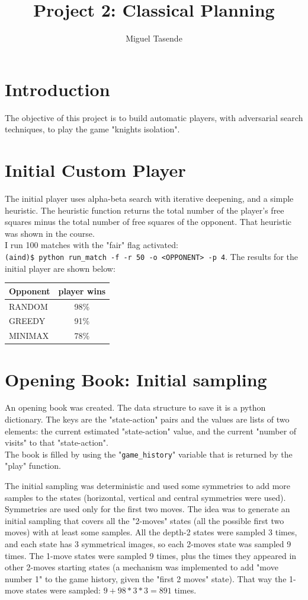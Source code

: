 \documentclass[a4paper,12pt]{article}
\title{\textbf{Project 2: Classical Planning}}
\author{Miguel Tasende}
\begin{document}
\maketitle

\section{Introduction}
The objective of this project is to build automatic players, with adversarial search techniques, to play the game "knights isolation".

\section{Initial Custom Player}
The initial player uses alpha-beta search with iterative deepening, and a simple heuristic. The heuristic function returns the total number of the player's free squares minus the total number of free squares of the opponent. That heuristic was shown in the course.\\
I run 100 matches with the "fair" flag activated: \\
\verb+(aind)$ python run_match -f -r 50 -o <OPPONENT> -p 4+.
The results for the initial player are shown below:\\

\begin{tabular}{|l|c|}
 \hline
Opponent & player wins\\
\hline
RANDOM & 98\% \\
\hline
GREEDY & 91\% \\
\hline
MINIMAX & 78\% \\
\hline
\end{tabular}


\section{Opening Book: Initial sampling}
An opening book was created. The data structure to save it is a python dictionary. The keys are the "state-action" pairs and the values are lists of two elements: the current estimated "state-action" value, and the current "number of visits" to that "state-action".\\
The book is filled by using the "\verb+game_history+" variable that is returned by the "play" function.

The initial sampling was deterministic and used some symmetries to add more samples to the states (horizontal, vertical and central symmetries were used). Symmetries are used only for the first two moves. The idea was to generate an initial sampling that covers all the "2-moves" states (all the possible first two moves) with at least some samples. All the depth-2 states were sampled 3 times, and each state has 3 symmetrical images, so each 2-moves state was sampled 9 times. The 1-move states were sampled 9 times, plus the times they appeared in other 2-moves starting states (a mechanism was implemented to add "move number 1" to the game history, given the "first 2 moves" state). That way the 1-move states were sampled: $9 + 98 * 3 * 3 = 891$ times.\\
\end{document}
